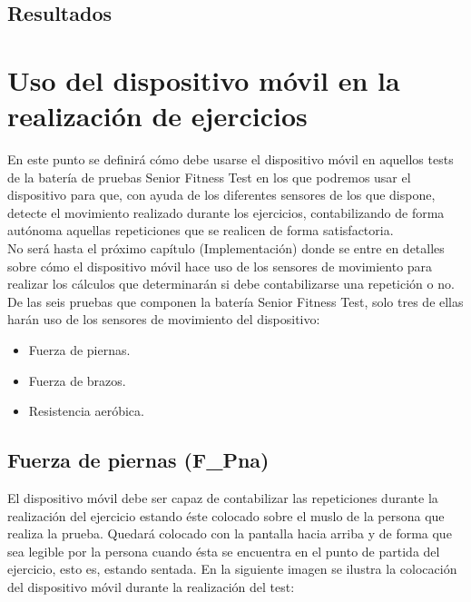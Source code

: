 \subsection{Resultados}


\section{Uso del dispositivo móvil en la realización de ejercicios}

En este punto se definirá cómo debe usarse el dispositivo móvil en aquellos tests de la batería de pruebas Senior Fitness Test en los que podremos usar el dispositivo para que, con ayuda de los diferentes sensores de los que dispone, detecte el movimiento realizado durante los ejercicios, contabilizando de forma autónoma aquellas repeticiones que se realicen de forma satisfactoria.\\

No será hasta el próximo capítulo (Implementación) donde se entre en detalles sobre cómo el dispositivo móvil hace uso de los sensores de movimiento para realizar los cálculos que determinarán si debe contabilizarse una repetición o no.\\

De las seis pruebas que componen la batería Senior Fitness Test, solo tres de ellas harán uso de los sensores de movimiento del dispositivo:

\begin{itemize}
\item Fuerza de piernas.
\item Fuerza de brazos.
\item Resistencia aeróbica.
\end{itemize}

\subsection{Fuerza de piernas (F\_Pna)}

El dispositivo móvil debe ser capaz de contabilizar las repeticiones durante la realización del ejercicio estando éste colocado sobre el muslo de la persona que realiza la prueba. Quedará colocado con la pantalla hacia arriba y de forma que sea legible por la persona cuando ésta se encuentra en el punto de partida del ejercicio, esto es, estando sentada. En la siguiente imagen se ilustra la colocación del dispositivo móvil durante la realización del test:

